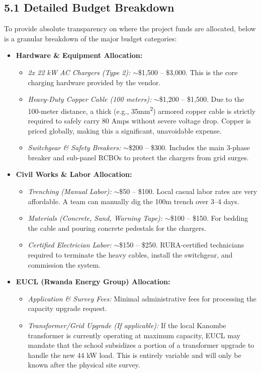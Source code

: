 \documentclass[11pt,a4paper]{article}
\begin{document}
\subsection{5.1 Detailed Budget Breakdown}
To provide absolute transparency on where the project funds are allocated, below is a granular breakdown of the major budget categories:

\begin{itemize}
    \item \textbf{Hardware \& Equipment Allocation:}
    \begin{itemize}
        \item \textit{2x 22 kW AC Chargers (Type 2):} $\sim$\$1,500 -- \$3,000. This is the core charging hardware provided by the vendor.
        \item \textit{Heavy-Duty Copper Cable (100 meters):} $\sim$\$1,200 -- \$1,500. Due to the 100-meter distance, a thick (e.g., 35mm\textsuperscript{2}) armored copper cable is strictly required to safely carry 80 Amps without severe voltage drop. Copper is priced globally, making this a significant, unavoidable expense.
        \item \textit{Switchgear \& Safety Breakers:} $\sim$\$200 -- \$300. Includes the main 3-phase breaker and sub-panel RCBOs to protect the chargers from grid surges.
    \end{itemize}
    
    \item \textbf{Civil Works \& Labor Allocation:}
    \begin{itemize}
        \item \textit{Trenching (Manual Labor):} $\sim$\$50 -- \$100. Local casual labor rates are very affordable. A team can manually dig the 100m trench over 3--4 days.
        \item \textit{Materials (Concrete, Sand, Warning Tape):} $\sim$\$100 -- \$150. For bedding the cable and pouring concrete pedestals for the chargers.
        \item \textit{Certified Electrician Labor:} $\sim$\$150 -- \$250. RURA-certified technicians required to terminate the heavy cables, install the switchgear, and commission the system.
    \end{itemize}
    
    \item \textbf{EUCL (Rwanda Energy Group) Allocation:}
    \begin{itemize}
        \item \textit{Application \& Survey Fees:} Minimal administrative fees for processing the capacity upgrade request.
        \item \textit{Transformer/Grid Upgrade (If applicable):} If the local Kanombe transformer is currently operating at maximum capacity, EUCL may mandate that the school subsidizes a portion of a transformer upgrade to handle the new 44 kW load. This is entirely variable and will only be known after the physical site survey.
    \end{itemize}
\end{itemize}
\end{document}
